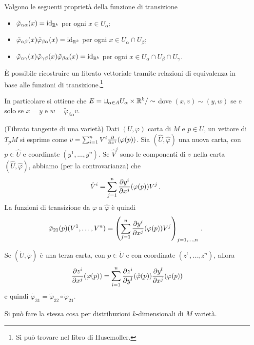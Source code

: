 \begin{proposition}
	Valgono le seguenti proprietà della funzione di transizione
	\begin{itemize}
	 \item $\tilde\varphi_{\alpha\alpha}(x)=\mathrm{id}_{\mathbb R^k}$ per ogni $x\in U_\alpha$;
	 \item $\tilde\varphi_{\alpha\beta}(x)\tilde\varphi_{\beta\alpha}(x) = \mathrm{id}_{\mathbb R^k}$ per ogni $x\in U_\alpha\cap U_\beta$;
	 \item $\tilde\varphi_{\alpha\gamma}(x) \tilde\varphi_{\gamma\beta}(x) \tilde\varphi_{\beta\alpha}(x) = \mathrm{id}_{\mathbb R^k}$ per ogni $x\in U_\alpha\cap U_\beta \cap U_\gamma$.
	\end{itemize}
\end{proposition}

\begin{remark}
	È possibile ricostruire un fibrato vettoriale tramite relazioni di equivalenza in base alle funzioni di transizione.\footnote{Si può trovare nel libro di Husemoller.}
	
	In particolare si ottiene che $E = \sqcup_{\alpha\in A} U_\alpha \times \mathbb R^k / \sim$ dove $(x,v)\sim (y,w)$ se e solo se $x=y$ e $w = \tilde\varphi_{\beta\alpha}v$.
\end{remark}

\begin{example}
	(Fibrato tangente di una varietà) Dati $(U,\varphi)$ carta di $M$ e $p\in U$, un vettore di $T_pM$ si esprime come $v = \sum_{i=1}^n V^i\frac{\partial }{\partial x^i}(\varphi(p))$. Sia $(\hat U, \hat \varphi)$ una nuova carta, con $p\in \hat U$ e coordinate $(y^1,\dots, y^n)$.
	 Se $\hat V^j$ sono le componenti di $v$ nella carta $(\hat U,\hat \varphi)$, abbiamo (per la controvarianza) che
	 \begin{equation*}
	 	\hat V^i = \sum_{j=1}^n \frac{\partial y^i}{\partial x^j}(\varphi(p))V^j\, \text{. }
	 \end{equation*}
	 La funzioni di transizione da $\varphi$ a $\hat \varphi$ è quindi
	 \begin{equation*}
	 \tilde\varphi_{21}(p)(V^1,\dots,V^n) = \left(\sum_{j=1}^n \frac{\partial y^i}{\partial x^j}(\varphi(p))V^j\right)_{j=1,\dots,n}\, \text{. }
	 \end{equation*}
	 
	 Se $(\check U, \check \varphi)$ è una terza carta, con $p\in \check U$ e con coordinate $(z^1,\dots,z^n)$, allora
	 \begin{equation*}
	 	\frac{\partial z^i}{\partial x^j}(\varphi(p)) = \sum_{l=1}^n \frac{\partial z^i}{\partial y^l}(\hat\varphi(p)) \frac{\partial y^l}{\partial x^j}(\varphi(p))  
	 \end{equation*}
	e quindi $\tilde\varphi_{31}=\tilde\varphi_{32}\circ \tilde\varphi_{21}$.
	
	Si può fare la stessa cosa per distribuzioni $k$-dimensionali di $M$ varietà.
	
\end{example}

